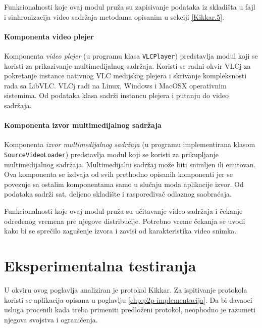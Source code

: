 \documentclass[12pt,oneside]{memoir}
\begin{document}
Funkcionalnosti koje ovaj modul pruža su zapisivanje podataka iz skladišta u fajl i sinhronizacija video sadržaja metodama opisanim u sekciji \ref{Kikkar.5}.


\subsubsection{Komponenta video plejer}
\label{implementacija.2.3.8}

Komponenta \textit{video plejer} (u programu klasa \texttt{VLCPlayer}) predstavlja modul koji se koristi za prikazivanje multimedijalnog sadržaja. Koristi se radni okvir VLCj za pokretanje instance nativnog VLC medijskog plejera i skrivanje kompleksnosti rada sa LibVLC. VLCj radi na Linux, Windows i MacOSX operativnim sistemima. Od podataka klasa sadrži instancu plejera i putanju do video sadržaja. 


\subsubsection{Komponenta izvor multimedijalnog sadržaja}
\label{implementacija.2.3.9}
Komponenta \textit{izvor multimedijalnog sadržaja} (u programu implementirana klasom \texttt{SourceVideoLoader}) predstavlja modul koji se koristi za prikupljanje multimedijalnog sadržaja. Multimedijalni sadržaj može biti snimljen ili emitovan. Ova komponenta se izdvaja od svih prethodno opisanih komponenti jer se povezuje sa ostalim komponentama samo u slučaju moda aplikacije izvor. Od podataka sadrži sat, deljeno skladište i raspoređivač odlaznog saobraćaja.

Funkcionalnosti koje ovaj modul pruža su učitavanje video sadržaja i čekanje određenog vremena pre njegove distribucije. Potrebno vreme čekanja se uvodi kako bi se sprečilo zagušenje izvora i zavisi od karakteristika video snimka.

\chapter{Eksperimentalna testiranja}
\label{chp:testiranja}

U okviru ovog poglavlja analiziran je protokol Kikkar. Za ispitivanje protokola koristi se aplikacija opisana u poglavlju \ref{chp:p2p-implementacija}. Da bi davaoci usluga procenili kada treba primeniti predloženi protokol, neophodno je razumeti njegova svojstva i ograničenja. 
\end{document}
